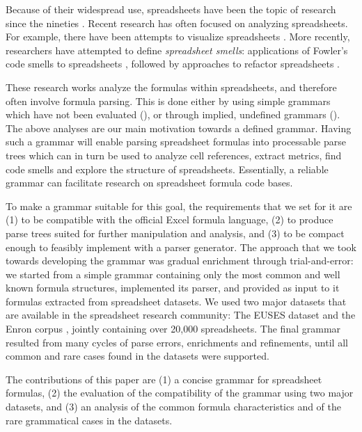 \documentclass[conference]{IEEEtran}
\begin{document}
Because of their widespread use, spreadsheets have been the topic of research since the nineties \cite{DBLP:journals/sigplan/BellP93}. Recent research has often focused on analyzing spreadsheets. For example, there have been attempts to visualize spreadsheets \cite{DBLP:conf/icse/HermansPD11, Shio1999}. More recently, researchers have attempted to define \emph{spreadsheet smells}: applications of Fowler's code smells to spreadsheets \cite{DBLP:conf/icse/HermansPD12, DBLP:conf/icsm/Hermans212}, followed by approaches to refactor spreadsheets \cite{hermans2014bumblebee,badame2012refactoring}.

These research works analyze the formulas within spreadsheets, and therefore often involve formula parsing. This is done either by using simple grammars which have not been evaluated (\cite{badame2012refactoring}), or through implied, undefined grammars (\cite{DBLP:conf/icse/HermansPD11,DBLP:conf/icse/HermansPD12, DBLP:conf/icsm/Hermans212, hermans2014bumblebee}). The above analyses are our main motivation towards a defined grammar. Having such a grammar will enable parsing spreadsheet formulas into processable parse trees which can in turn be used to analyze cell references, extract metrics, find code smells and explore the structure of spreadsheets. Essentially, a reliable grammar can facilitate research on spreadsheet formula code bases.

To make a grammar suitable for this goal, the requirements that we set for it are (1) to be compatible with the official Excel formula language, (2) to produce parse trees suited for further manipulation and analysis, and (3) to be compact enough to feasibly implement with a parser generator. The approach that we took towards developing the grammar was gradual enrichment through trial-and-error: we started from a simple grammar containing only the most common and well known formula structures, implemented its parser, and provided as input to it formulas extracted from spreadsheet datasets. We used two major datasets that are available in the spreadsheet research community: The EUSES dataset \cite{euses} and the Enron corpus \cite{enron}, jointly containing over 20,000 spreadsheets. The final grammar resulted from many cycles of parse errors, enrichments and refinements, until all common and rare cases found in the datasets were supported.

The contributions of this paper are (1) a concise grammar for spreadsheet formulas, (2) the evaluation of the compatibility of the grammar using two major datasets, and (3) an analysis of the common formula characteristics and of the rare grammatical cases in the datasets.
\end{document}
